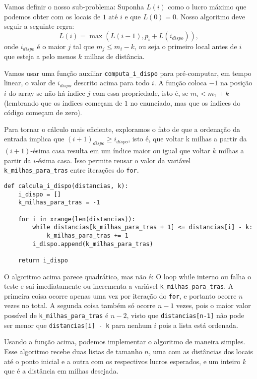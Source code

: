 \documentclass[11pt]{article}
\begin{document}
Vamos definir o nosso sub-problema: Suponha $L(i)$ como o lucro
máximo que podemos obter com os locais de $1 \text{ até } i$ e que
$L(0)=0$. Nosso algoritmo deve seguir a seguinte regra:
\[ L(i) = \max{(L(i-1),p_i + L(i_{dispo}))} ,\]
onde $i_{dispo}$ é o maior $j$ tal que $m_j \leq m_i - k$, ou seja
o primeiro local antes de $i$ que esteja a pelo menos $k$ milhas de
distância.

Vamos usar uma função auxiliar \verb~computa_i_dispo~ para pré-computar, em
tempo linear, o valor de $i_{dispo}$ descrito acima para todo $i$.  A
função coloca $-1$ na posição $i$ do array se não há índice $j$ com
essa propriedade, isto é, se $m_i < m_1 + k$ (lembrando que os índices
começam de $1$ no enunciado, mas que os índices do código começam de
zero).

Para tornar o cálculo mais eficiente, exploramos o fato de que a
ordenação da entrada implica que $(i+1)_{dispo} \geq i_{dispo}$, isto
é, que voltar k milhas a partir da $(i+1)$-ésima casa resulta em um
índice maior ou igual que voltar $k$ milhas a partir da $i$-ésima
casa. Isso permite reusar o valor da variável \verb~k_milhas_para_tras~
entre iterações do \verb~for~.

\begin{verbatim}
def calcula_i_dispo(distancias, k):
    i_dispo = []
    k_milhas_para_tras = -1

    for i in xrange(len(distancias)):
        while distancias[k_milhas_para_tras + 1] <= distancias[i] - k:
            k_milhas_para_tras += 1
        i_dispo.append(k_milhas_para_tras)

    return i_dispo
\end{verbatim}

O algoritmo acima parece quadrático, mas não é: O loop while interno
ou falha o teste e sai imediatamente ou incrementa a variável
\verb~k_milhas_para_tras~. A primeira coisa ocorre apenas uma vez por
iteração do \verb~for~, e portanto ocorre $n$ vezes no total. A segunda
coisa também só ocorre $n-1$ vezes, pois o maior valor possível de
\verb~k_milhas_para_tras~ é $n-2$, visto que \verb~distancias[n-1]~ não pode ser menor
que \verb~distancias[i] - k~ para nenhum $i$ pois a lista está ordenada.

Usando a função acima, podemos implementar o algoritmo de maneira simples.
Esse algoritmo recebe duas listas de tamanho $n$, uma com as distâncias
dos locais até o ponto inicial e a outra com os respectivos lucros
esperados, e um inteiro $k$ que é a distância em milhas desejada.
\end{document}
